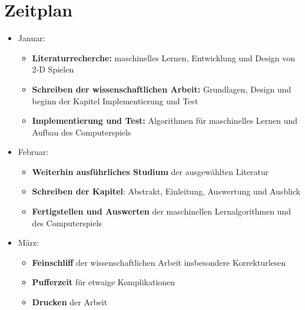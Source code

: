 \documentclass[12pt,a4paper]{article}
\begin{document}
\section*{Zeitplan}
\begin{itemize}
	\item Januar:
	\begin{itemize}
		\item \textbf{Literaturrecherche:} maschinelles Lernen, Entwicklung und Design von 2-D Spielen
		\item \textbf{Schreiben der wissenschaftlichen Arbeit:} Grundlagen, Design und beginn der Kapitel Implementierung und Test
		\item \textbf{Implementierung und Test:} Algorithmen für maschinelles Lernen und Aufbau des Computerspiels
	\end{itemize}
	\item Februar:
	\begin{itemize}
		\item \textbf{Weiterhin ausführliches Studium} der ausgewählten Literatur
		\item \textbf{Schreiben der Kapitel}: Abstrakt, Einleitung, Auswertung und Ausblick
		\item \textbf{Fertigstellen und Auswerten} der maschinellen Lernalgorithmen und des Computerspiels
	\end{itemize}
	\item März:
	\begin{itemize}
		\item \textbf{Feinschliff} der wissenschaftlichen Arbeit insbesondere Korrekturlesen
		\item \textbf{Pufferzeit} für etwaige Komplikationen
		\item \textbf{Drucken} der Arbeit
	\end{itemize}
\end{itemize}
\end{document}
